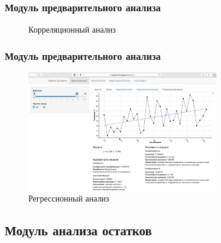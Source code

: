 \documentclass[10pt,pdf,aspectratio=169,hyperref={unicode}]{beamer}
\begin{document}
\begin{frame}
  \frametitle{Модуль предварительного анализа}
  \begin{figure}[h]
    \caption{Корреляционный анализ}
  \end{figure}
\end{frame}

\begin{frame}
  \frametitle{Модуль предварительного анализа}
    \begin{figure}[h]
    \includegraphics[width=0.75\textwidth]{../../figures/static/2_regr.png}
    \caption{Регрессионный анализ}
  \end{figure}
\end{frame}

\subsection{Модуль анализа остатков}
\end{document}
